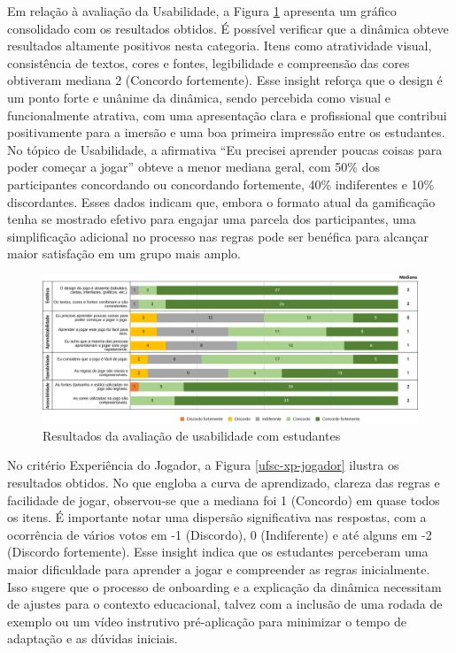 \documentclass[
	12pt,
	openright,
	twoside,
	a4paper,
	english,
	brazil
	]{abntex2}
\begin{document}
Em relação à avaliação da Usabilidade, a Figura \ref{ufsc-usabilidade} apresenta um gráfico consolidado com os resultados obtidos. É possível verificar que a dinâmica obteve resultados altamente positivos nesta categoria. Itens como atratividade visual, consistência de textos, cores e fontes, legibilidade e compreensão das cores obtiveram mediana 2 (Concordo fortemente). Esse insight reforça que o design é um ponto forte e unânime da dinâmica, sendo percebida como visual e funcionalmente atrativa, com uma apresentação clara e profissional que contribui positivamente para a imersão e uma boa primeira impressão entre os estudantes. No tópico de Usabilidade, a afirmativa  “Eu precisei aprender poucas coisas para poder começar a jogar” obteve a menor mediana geral, com 50\% dos participantes concordando ou concordando fortemente, 40\% indiferentes e 10\% discordantes. Esses dados indicam que, embora o formato atual da gamificação tenha se mostrado efetivo para engajar uma parcela dos participantes, uma simplificação adicional no processo nas regras pode ser benéfica para alcançar maior satisfação em um grupo mais amplo.

\begin{figure}[H]
	\caption{\label{ufsc-usabilidade} Resultados da avaliação de usabilidade com estudantes}
  \includegraphics[width=\textwidth]{ufsc-usabilidade}
\end{figure}

No critério Experiência do Jogador, a Figura \ref{ufsc-xp-jogador} ilustra os resultados obtidos. No que engloba a curva de aprendizado, clareza das regras e facilidade de jogar, observou-se que a mediana foi 1 (Concordo) em quase todos os itens. É importante notar uma dispersão significativa nas respostas, com a ocorrência de vários votos em -1 (Discordo), 0 (Indiferente) e até alguns em -2 (Discordo fortemente). Esse insight indica que os estudantes perceberam uma maior dificuldade para aprender a jogar e compreender as regras inicialmente. Isso sugere que o processo de onboarding e a explicação da dinâmica necessitam de ajustes para o contexto educacional, talvez com a inclusão de uma rodada de exemplo ou um vídeo instrutivo pré-aplicação para minimizar o tempo de adaptação e as dúvidas iniciais.
\end{document}
